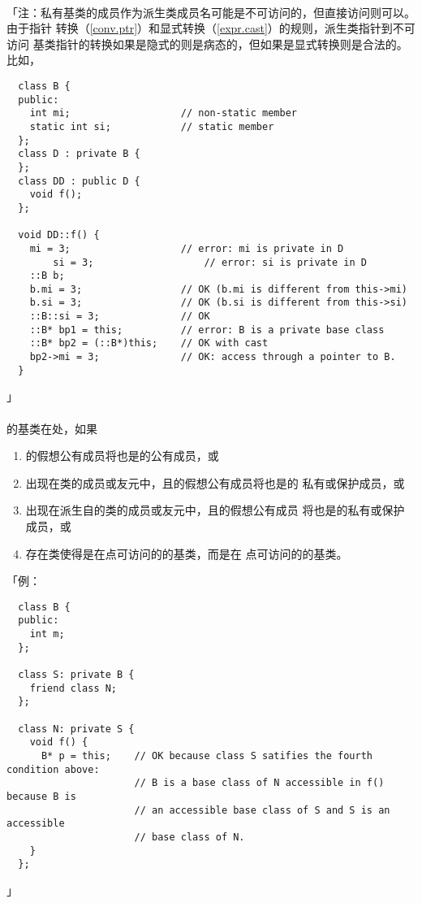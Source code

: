 \paragraph{}
「注：私有基类的成员作为派生类成员名可能是不可访问的，但直接访问则可以。由于指针
转换（\ref{conv.ptr}）和显式转换（\ref{expr.cast}）的规则，派生类指针到不可访问
基类指针的转换如果是隐式的则是病态的，但如果是显式转换则是合法的。比如，
\begin{lstlisting}
  class B {
  public:
    int mi;                   // non-static member
    static int si;            // static member
  };
  class D : private B {
  };
  class DD : public D {
    void f();
  };

  void DD::f() {
    mi = 3;                   // error: mi is private in D
		si = 3;                   // error: si is private in D
    ::B b;
    b.mi = 3;                 // OK (b.mi is different from this->mi)
    b.si = 3;                 // OK (b.si is different from this->si)
    ::B::si = 3;              // OK
    ::B* bp1 = this;          // error: B is a private base class
    ::B* bp2 = (::B*)this;    // OK with cast
    bp2->mi = 3;              // OK: access through a pointer to B.
  }
\end{lstlisting}」

\paragraph{}
的基类在处，如果
\begin{enumerate}
  \item{的假想公有成员将也是的公有成员，或}
  \item{出现在类的成员或友元中，且的假想公有成员将也是的
    私有或保护成员，或}
  \item{出现在派生自的类的成员或友元中，且的假想公有成员
    将也是的私有或保护成员，或}
  \item{存在类使得是在点可访问的的基类，而是在
    点可访问的的基类。}
\end{enumerate}
「例：
\begin{lstlisting}
  class B {
  public:
    int m;
  };

  class S: private B {
    friend class N;
  };

  class N: private S {
    void f() {
      B* p = this;    // OK because class S satifies the fourth condition above:
                      // B is a base class of N accessible in f() because B is
                      // an accessible base class of S and S is an accessible
                      // base class of N.
    }
  };
\end{lstlisting}」

